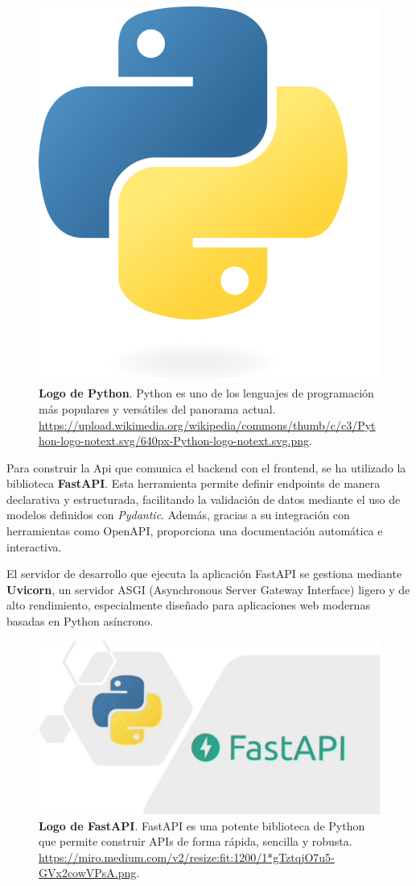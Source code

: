 \begin{figure}[H]
	\centering
	\includegraphics[width=0.5\linewidth]{imagenes/pythonLogo.png}
	\caption[\textbf{Logo de Python}.]{\textbf{Logo de Python}. Python es uno de los lenguajes de programación más populares y versátiles del panorama actual. \href{https://upload.wikimedia.org/wikipedia/commons/thumb/c/c3/Python-logo-notext.svg/640px-Python-logo-notext.svg.png}{https://upload.wikimedia.org/wikipedia/commons/thumb/c/c3/Python-logo-notext.svg/640px-Python-logo-notext.svg.png}.}
	\label{fig:python-logo}
\end{figure}

Para construir la Api que comunica el backend con el frontend, se ha utilizado la biblioteca \textbf{FastAPI}. Esta herramienta permite definir endpoints de manera declarativa y estructurada, facilitando la validación de datos mediante el uso de modelos definidos con \textit{Pydantic}. Además, gracias a su integración con herramientas como OpenAPI, proporciona una documentación automática e interactiva.

El servidor de desarrollo que ejecuta la aplicación FastAPI se gestiona mediante \textbf{Uvicorn}, un servidor ASGI (Asynchronous Server Gateway Interface) ligero y de alto rendimiento, especialmente diseñado para aplicaciones web modernas basadas en Python asíncrono.

\begin{figure}[H]
	\centering
	\includegraphics[width=1\linewidth]{imagenes/fastapiLogo.png}
	\caption[\textbf{Logo de FastAPI}.]{\textbf{Logo de FastAPI}. FastAPI es una potente biblioteca de Python que permite construir APIs de forma rápida, sencilla y robusta. \href{https://miro.medium.com/v2/resize:fit:1200/1*gTztqjO7u5-GVx2cowVPsA.png}{https://miro.medium.com/v2/resize:fit:1200/1*gTztqjO7u5-GVx2cowVPsA.png}.}
	\label{fig:fastapi-logo}
\end{figure}

